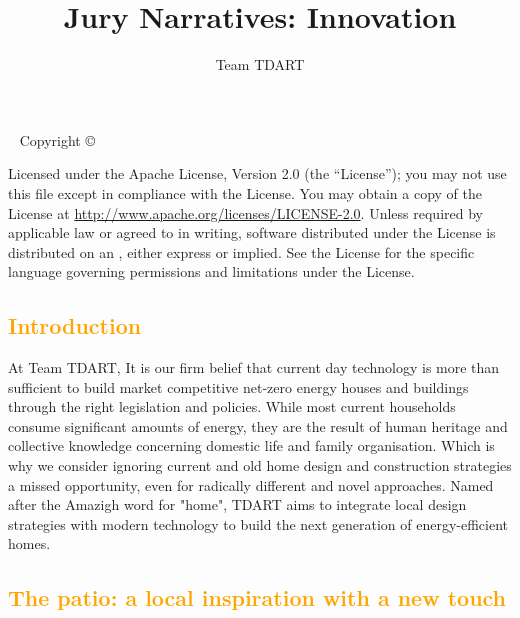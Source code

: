 \documentclass[justified]{tufte-book}
\author{Team TDART\hfill \usebox{\titleimage} }
\title[Jury Narratives]{Jury Narratives: Innovation}
\newcommand{\monthyear}{%
	\ifcase\month\or January\or February\or March\or April\or May\or June\or
	July\or August\or September\or October\or November\or
	December\fi\space\number\year
}
\begin{document}
	\frontmatter
	\maketitle
	\newpage
	\begin{fullwidth}
		~\vfill
		\thispagestyle{empty}
		\setlength{\parindent}{0pt}
		\setlength{\parskip}{\baselineskip}
		Copyright \copyright\ \the\year\ \thanklessauthor
		
		\par{}
		
		
		\par Licensed under the Apache License, Version 2.0 (the ``License''); you may not
		use this file except in compliance with the License. You may obtain a copy
		of the License at \url{http://www.apache.org/licenses/LICENSE-2.0}. Unless
		required by applicable law or agreed to in writing, software distributed
		under the License is distributed on an , either express or implied. See the
		License for the specific language governing permissions and limitations
		under the License.
		
	\end{fullwidth}
	
	
	\textcolor{orange}{\chapter*{Introduction}}
	At Team TDART, It is our firm belief that current day technology is more than sufficient to build market competitive net-zero energy houses and buildings through the right legislation and policies. While most current households consume significant amounts of energy, they are the result of human heritage and collective knowledge concerning domestic life and family organisation. Which is why we consider ignoring current and old home design and construction strategies a missed opportunity, even for radically different and novel approaches. Named after the Amazigh word for "home", TDART aims to integrate local design strategies with modern technology to build the next generation of energy-efficient homes.
	
	\textcolor{orange}{\chapter{The patio: a local inspiration with a new touch}}
	\label{ch:patio}
	
\end{document}
